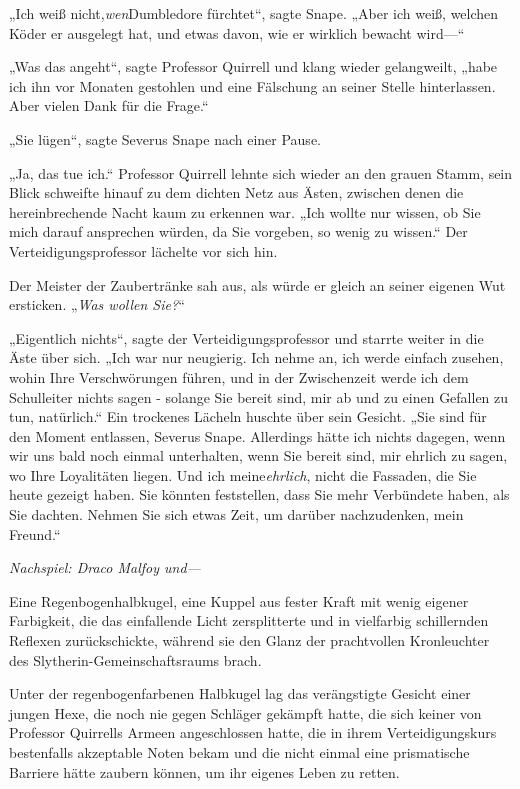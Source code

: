 {„Ich weiß nicht,\emph{wen}Dumbledore fürchtet“, sagte Snape. „Aber ich weiß, welchen Köder er ausgelegt hat, und etwas davon, wie er wirklich bewacht wird—“

„Was das angeht“, sagte Professor Quirrell und klang wieder gelangweilt, „habe ich ihn vor Monaten gestohlen und eine Fälschung an seiner Stelle hinterlassen. Aber vielen Dank für die Frage.“

„Sie lügen“, sagte Severus Snape nach einer Pause.

„Ja, das tue ich.“ Professor Quirrell lehnte sich wieder an den grauen Stamm, sein Blick schweifte hinauf zu dem dichten Netz aus Ästen, zwischen denen die hereinbrechende Nacht kaum zu erkennen war. „Ich wollte nur wissen, ob Sie mich darauf ansprechen würden, da Sie vorgeben, so wenig zu wissen.“ Der Verteidigungsprofessor lächelte vor sich hin.

Der Meister der Zaubertränke sah aus, als würde er gleich an seiner eigenen Wut ersticken. „\emph{Was wollen Sie?}“

„Eigentlich nichts“, sagte der Verteidigungsprofessor und starrte weiter in die Äste über sich. „Ich war nur neugierig. Ich nehme an, ich werde einfach zusehen, wohin Ihre Verschwörungen führen, und in der Zwischenzeit werde ich dem Schulleiter nichts sagen - solange Sie bereit sind, mir ab und zu einen Gefallen zu tun, natürlich.“ Ein trockenes Lächeln huschte über sein Gesicht. „Sie sind für den Moment entlassen, Severus Snape. Allerdings hätte ich nichts dagegen, wenn wir uns bald noch einmal unterhalten, wenn Sie bereit sind, mir ehrlich zu sagen, wo Ihre Loyalitäten liegen. Und ich meine\emph{ehrlich}, nicht die Fassaden, die Sie heute gezeigt haben. Sie könnten feststellen, dass Sie mehr Verbündete haben, als Sie dachten. Nehmen Sie sich etwas Zeit, um darüber nachzudenken, mein Freund.“

\emph{Nachspiel: Draco Malfoy und—}

Eine Regenbogenhalbkugel, eine Kuppel aus fester Kraft mit wenig eigener Farbigkeit, die das einfallende Licht zersplitterte und in vielfarbig schillernden Reflexen zurückschickte, während sie den Glanz der prachtvollen Kronleuchter des Slytherin-Gemeinschaftsraums brach.

Unter der regenbogenfarbenen Halbkugel lag das verängstigte Gesicht einer jungen Hexe, die noch nie gegen Schläger gekämpft hatte, die sich keiner von Professor Quirrells Armeen angeschlossen hatte, die in ihrem Verteidigungskurs bestenfalls akzeptable Noten bekam und die nicht einmal eine prismatische Barriere hätte zaubern können, um ihr eigenes Leben zu retten.

}
